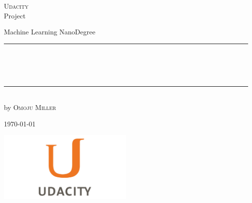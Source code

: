
\begin{titlepage}
    \begin{addmargin}[-1cm]{-3cm}
    \begin{center}
        \large
        {\Large \textsc{Udacity}}\\[1ex]
        Project\\
       

        \vfill

        Machine Learning NanoDegree\\ \vskip1cm
        \rule{14cm}{0.4pt}\\ \bigskip
        \begingroup
            \Large
            \color{Maroon}\spacedallcaps{\myTitle} \\ \bigskip
        \endgroup
        \spacedlowsmallcaps{\mySubtitle} \\ \bigskip
        \rule{14cm}{0.4pt}\\ \vskip1cm
        by \textsc{Omoju Miller}

        \vfill
        \vfill
        \vfill

       
        \hfill \today
    \end{center}
    \vspace{-3.5cm}
    \includegraphics[width=0.50\textwidth]{figures/udacityLogo}
  \end{addmargin}
\end{titlepage}
